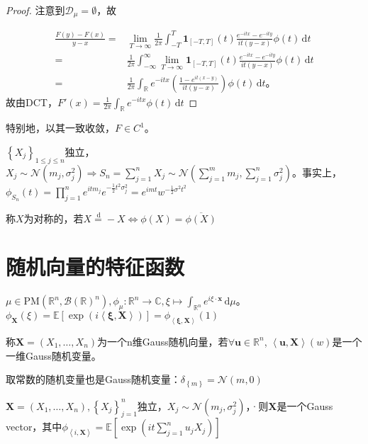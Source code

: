 \documentclass{ctexart}
\begin{document}
\begin{proof}
  注意到$\mathcal{D}_{\mu}=\emptyset$，故
  
\begin{align*}
  \frac{F(y)-F(x)}{y-x}=&\lim\limits_{T\to\infty}\frac{1}{2\pi}\int_{-T}^{T}\mathbf{1}_{[-T,T]}(t)\frac{e^{-itx}-e^{-ity}}{it(y-x)}\phi(t)  \,\mathrm{d}t\\
  =&\frac{1}{2\pi}\int_{-\infty}^{\infty}\lim\limits_{T\to\infty}\mathbf{1}_{[-T,T]}(t)\frac{e^{-itx}-e^{-ity}}{it(y-x)}\phi(t)  \,\mathrm{d}t\\
  =&\frac{1}{2\pi}\int_{\mathbb{R}}e^{-itx}(\frac{1-e^{it (x-y)}}{it(y-x)})\phi(t) \,\mathrm{d}t。
\end{align*}
故由DCT，$F'(x)=\frac{1}{2\pi}\int_{\mathbb{R}}e^{-itx}\phi(t) \,\mathrm{d}t$
\end{proof}

特别地，以其一致收敛，$F\in C^1$。

\begin{Eg}
  $\left\{ X_j \right\}_{1\leq j\leq n}$独立，$X_j\sim \mathcal{N}(m_j,\sigma_j^2)\Rightarrow S_n=\sum\limits_{j=1}^n X_j \sim \mathcal{N}(\sum\limits_{j=1}^m m_j, \sum\limits_{j=1}^n \sigma_j^2)$。事实上，$\phi_{S_n}(t)= \prod_{j=1}^{n} e^{itm_j}e^{-\frac{1}{2} t^2 \sigma_j^2}=e^{imt}w^{-\frac{1}{2}\sigma^2 t^2}$
\end{Eg}

\begin{Eg}
  称$X$为对称的，若$X \stackrel{\,\mathrm{d}}{=} -X \Leftrightarrow \phi(X)= \overline{\phi(X)}$
\end{Eg}

\section{随机向量的特征函数}
$\mu\in \mathrm{PM}(\mathbb{R}^n, \mathcal{B}(\mathbb{R})^n), \phi_{\mu}: \mathbb{R}^n\to \mathbb{C}, \xi\mapsto \int_{\mathbb{R}^n}e^{i\xi\cdot \mathbf{x}} \,\mathrm{d}\mu$。$\phi_{\mathbf{X}}(\xi)= \underset{}{\mathbb{E}}\left[ \exp(i \left\langle \mathbf{\xi}, \mathbf{X} \right\rangle)\right]= \phi_{\left\langle \mathbf{\xi}, \mathbf{X} \right\rangle}(1) $

\begin{Def}[Gauss随机向量]
  称$\mathbf{X}=\left(X_{1},\dots, X_{n}\right)$为一个n维Gauss随机向量，若$\forall \mathbf{u}\in \mathbb{R}^n$, $\left\langle \mathbf{u}, \mathbf{X} \right\rangle(w)$是一个一维Gauss随机变量。
\end{Def}
\begin{Rmk}
  取常数的随机变量也是Gauss随机变量：$\delta_{\left\{ m \right\}}=\mathcal{N}(m,0)$
\end{Rmk}
\begin{Eg}
  $\mathbf{X}=(X_1,\dots, X_n), \left\{ X_j \right\}_{j=1}^n$独立，$X_j\sim \mathcal{N}(m_j, \sigma_j^2)$，·则$\mathbf{X}$是一个Gauss vector，其中$\phi_{\left\langle i,\mathbf{X} \right\rangle}=\mathbb{E}\left[ \exp(it \sum\limits_{j=1}^n u_j X_j) \right]$
\end{Eg}
\end{document}
